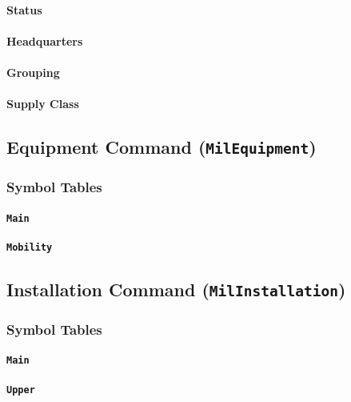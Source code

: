 \documentclass[a4paper, titlepage]{article}
\begin{document}
\paragraph{Status}

\paragraph{Headquarters}

\paragraph{Grouping}

\paragraph{Supply Class}

\subsection{Equipment Command (\textbf{\texttt{MilEquipment}})}

\subsubsection{Symbol Tables}

\paragraph{\texttt{Main}}

\paragraph{\texttt{Mobility}}

\subsection{Installation Command (\textbf{\texttt{MilInstallation}})}

\subsubsection{Symbol Tables}

\paragraph{\texttt{Main}}

\paragraph{\texttt{Upper}}
\end{document}
